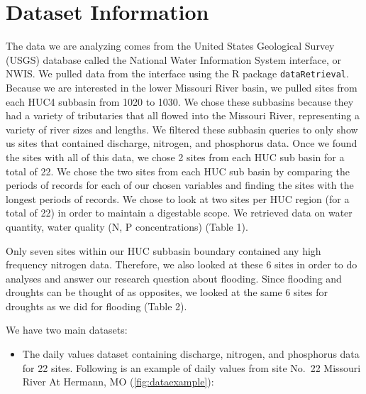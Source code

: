 \documentclass[12pt,]{article}
\providecommand{\tightlist}{%
  \setlength{\itemsep}{0pt}\setlength{\parskip}{0pt}}
\begin{document}
\newpage

\hypertarget{dataset-information}{%
\section{Dataset Information}\label{dataset-information}}

The data we are analyzing comes from the United States Geological Survey
(USGS) database called the National Water Information System interface,
or NWIS. We pulled data from the interface using the R package
\texttt{dataRetrieval}. Because we are interested in the lower Missouri
River basin, we pulled sites from each HUC4 subbasin from 1020 to 1030.
We chose these subbasins because they had a variety of tributaries that
all flowed into the Missouri River, representing a variety of river
sizes and lengths. We filtered these subbasin queries to only show us
sites that contained discharge, nitrogen, and phosphorus data. Once we
found the sites with all of this data, we chose 2 sites from each HUC
sub basin for a total of 22. We chose the two sites from each HUC sub
basin by comparing the periods of records for each of our chosen
variables and finding the sites with the longest periods of records. We
chose to look at two sites per HUC region (for a total of 22) in order
to maintain a digestable scope. We retrieved data on water quantity,
water quality (N, P concentrations) (Table 1).

Only seven sites within our HUC subbasin boundary contained any high
frequency nitrogen data. Therefore, we also looked at these 6 sites in
order to do analyses and answer our research question about flooding.
Since flooding and droughts can be thought of as opposites, we looked at
the same 6 sites for droughts as we did for flooding (Table 2).

We have two main datasets:

\begin{itemize}
\tightlist
\item
  The daily values dataset containing discharge, nitrogen, and
  phosphorus data for 22 sites. Following is an example of daily values
  from site No.~22 Missouri River At Hermann, MO
  (\autoref{fig:dataexample}):
\end{itemize}
\end{document}
